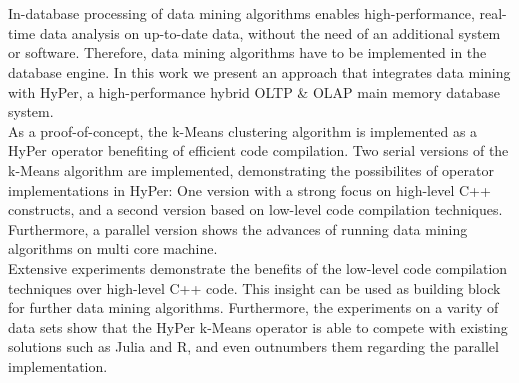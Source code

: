 \chapter{\abstractname}

In-database processing of data mining algorithms enables high-performance, real-time data analysis on up-to-date data, without the need of an additional system or software. Therefore, data mining algorithms have to be implemented in the database engine. In this work we present an approach that integrates data mining with HyPer, a high-performance hybrid OLTP \& OLAP main memory database system.
\\
As a proof-of-concept, the k-Means clustering algorithm is implemented as a HyPer operator benefiting of efficient code compilation. Two serial versions of the k-Means algorithm are implemented, demonstrating the possibilites of operator implementations in HyPer: One version with a strong focus on high-level C++ constructs, and a second version based on low-level code compilation techniques. Furthermore, a parallel version shows the advances of running data mining algorithms on multi core machine. 
\\
Extensive experiments demonstrate  the benefits of the low-level code compilation techniques over high-level C++ code. This insight can be used as building block for further data mining algorithms. Furthermore, the experiments on a varity of data sets show that the HyPer k-Means operator is able to compete with existing solutions such as Julia and R, and even outnumbers them regarding the parallel implementation. 

